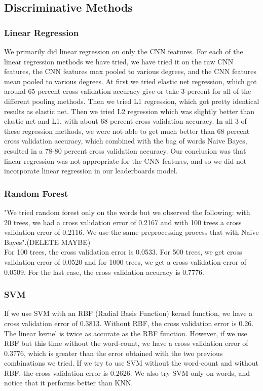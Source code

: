 \documentclass[11pt,twocolumn]{report}
\begin{document}
    
    \subsection*{Discriminative Methods}
    \subsubsection{Linear Regression}
	We primarily did linear regression on only the CNN features. For each of the linear regression methods we have tried, we have tried it on the raw CNN features, the CNN features max pooled to various degrees, and the CNN features mean pooled to various degrees.    
    At first we tried elastic net regression, which got around 65 percent cross validation accuracy give or take 3 percent for all of the different pooling methods. Then we tried L1 regression, which got pretty identical results as elastic net. Then we tried L2 regression which was slightly better than elastic net and L1, with about 68 percent cross validation accuracy. 
    In all 3 of these regression methods, we were not able to get much better than 68 percent cross validation accuracy, which combined with the bag of words Naive Bayes, resulted in a 78-80 percent cross validation accuracy. Our conclusion was that linear regression was not appropriate for the CNN features, and so we did not incorporate linear regression in our leaderboards model. 
    
     \subsubsection{Random Forest}
     "We tried random forest only on the words but we observed the following: with 20 trees, we had a cross validation error of 0.2167 and with 100 trees a cross validation error of 0.2116. We use the same preprocessing process that with Naive Bayes".(DELETE MAYBE)\\
     For 100 trees, the cross validation error is 0.0533. For 500 trees, we get cross validation error of 0.0520 and for 1000 trees, we get a cross validation error of 0.0509. For the last case, the cross validation accuracy is 0.7776.
    \subsubsection{SVM}
    
    If we use SVM with an RBF (Radial Basis Function) kernel function, we have a cross validation error of 0.3813. Without RBF, the cross validation error is 0.26. The linear kernel is twice as accurate as the RBF function. However, if we use RBF but this time without the word-count, we have a cross validation error of 0.3776, which is greater than the error obtained with the two previous combinations we tried. If we try to use SVM without the word-count and without RBF, the cross validation error is 0.2626. We also try SVM only on words, and notice that it performs better than KNN.
    
\end{document}
